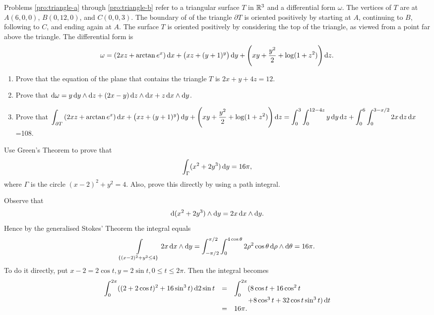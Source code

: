 \begin{problem}  Problems \ref{pro:triangle-a} through \ref{pro:triangle-b}
refer to a triangular surface  $T$ in $\mathbb{R}^3$ and a differential
form $\omega$. The vertices of $T$ are at $A(6,0,0)$, $B(0,12,0)$,
and $C(0,0,3)$. The boundary of of the triangle $\partial T$ is
oriented positively by starting at $A$, continuing to $B$, following
to $C$, and ending again at  $A$. The surface $T$ is oriented
positively by considering the top of the triangle, as viewed from a
point far above the triangle. The differential form is
$$\omega = \left(2xz+\arctan e^x\right)\d{x} + \left(xz+(y+1)^y\right)\d{y} + \left(xy+\dfrac{y^2}{2}+\log (1+z^2)\right)\d{z}.   $$

\begin{enumerate}
\item  \label{pro:triangle-a} Prove that the equation of the plane that
 contains the triangle $T$ is $ 2x+y+4z=12 $.
 \item Prove that $\d{\omega}=y\d{y}\wedge\d{z}
+\left(2x-y\right)\d{z}\wedge\d{x}+z\d{x}\wedge\d{y}$.
\item  \label{pro:triangle-b} Prove that $\dint _{\partial T}  \left(2xz+\arctan e^x\right)\d{x} + \left(xz+(y+1)^y\right)\d{y} + \left(xy+\dfrac{y^2}{2}+\log
(1+z^2)\right)\d{z}=\dint _0 ^3 \dint _0 ^{12-4z} y\d{y}\d{z} +\dint
_0 ^6 \dint _0 ^{3-x/2} 2x\d{z}\d{x}$=108.
\end{enumerate}
\end{problem}


\begin{problem}
Use Green's Theorem to prove that
$$\dint _\Gamma (x^2 + 2y^3)\d{y} = 16\pi,
$$where $\Gamma$ is the circle $(x - 2)^2 + y^2 = 4$. Also, prove this
directly by using  a path integral. \begin{answer} Observe that
$$ \d{(x^2 + 2y^3)\wedge\d{y}} = 2x\d{x}\wedge\d{y}.$$Hence by the
generalised Stokes' Theorem the integral equals $$\dint
\limits_{\{(x - 2)^2 + y^2 \leq 4\}} 2x\d{x}\wedge\d{y} = \dint
_{-\pi/2} ^{\pi/2} \dint _0 ^{4\cos\theta} 2\rho^2 \cos\theta\d{\rho}
\wedge\d\theta = 16\pi .
$$
To do it directly, put $x - 2 = 2\cos t, y = 2\sin t, 0 \leq t \leq
2\pi$. Then the integral becomes
$$\begin{array}{lll}\dint _0 ^{2\pi} ((2 + 2\cos t)^2 + 16\sin^3t)\d{2\sin t} & = & \dint _0 ^{2\pi} (8\cos t + 16\cos^2 t\\ & & \qquad  + 8\cos^3t + 32\cos t\sin^3t) \d{t}\\ & =  & 16\pi.  \end{array}  $$

\end{answer}
\end{problem}

